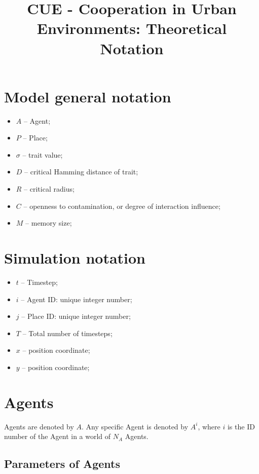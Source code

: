 \documentclass{article}
\title{CUE - Cooperation in Urban Environments: Theoretical Notation}
\author{}
\begin{document}
\maketitle

\section{Model general notation}

\begin{itemize}
    \item $A$ -- Agent;
    \item $P$ -- Place;
    \item $\sigma$ -- trait value;
    \item $D$ -- critical Hamming distance of trait;
    \item $R$ -- critical radius;
    \item $C$ -- openness to contamination, or degree of interaction influence;
    \item $M$ -- memory size;
    
\end{itemize}

\section{Simulation notation}

\begin{itemize}
    \item $t$ -- Timestep;
    \item $i$ -- Agent ID: unique integer number;
    \item $j$ -- Place ID: unique integer number;
    \item $T$ -- Total number of timesteps;
    \item $x$ -- position coordinate;
    \item $y$ -- position coordinate;
\end{itemize}

\section{Agents}

\par Agents are denoted by $A$. Any specific Agent is denoted by $A^{i}$, where $i$ is the ID number of the Agent in a world of $N_A$ Agents.  

\subsection{Parameters of Agents}
\end{document}
